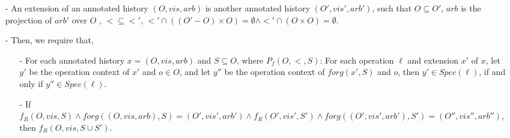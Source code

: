 \begin{itemize}

\item[-] An extension of an annotated history $(O,\mathit{vis},\mathit{arb})$ is another annotated history $(O',\mathit{vis}',\mathit{arb}')$, such that $O \subseteq O'$, $\mathit{arb}$ is the projection of $\mathit{arb}'$ over $O$ , $< \subseteq <'$, $<' \cap ( (O'-O) \times O ) = \emptyset \wedge <' \cap ( O \times O ) = \emptyset$. 




\item[-] Then, we require that, 
    \begin{itemize}
    \setlength{\itemsep}{0.5pt}
    \item[-] For each annotated history $x = (O,\mathit{vis},\mathit{arb})$ and $S \subseteq O$, where $P_f(O,<,S)$: For each operation $\ell$ and extension $x'$ of $x$, let $y'$ be the operation context of $x'$ and $o \in O$, and let $y''$ be the operation context of $forg(x',S)$ and $o$, then $y' \in Spec(\ell)$, if and only if $y'' \in Spec(\ell)$. 
    

    \item[-] If $f_R(O,\mathit{vis},S) \wedge forg((O,\mathit{vis},\mathit{arb}),S) = (O',\mathit{vis}',\mathit{arb}') \wedge f_R(O',\mathit{vis}',S') \wedge forg((O',\mathit{vis}',\mathit{arb}'),S') = (O'',\mathit{vis}'',\mathit{arb}'')$, then $f_R(O,\mathit{vis},S \cup S')$.
    \end{itemize}
\end{itemize}

